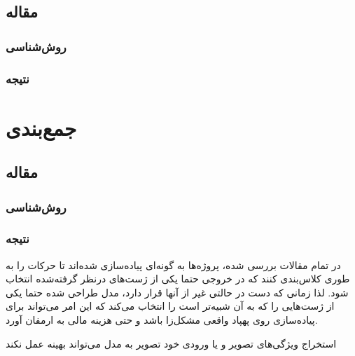 \subsection{مقاله }

\subsubsection{روش‌شناسی}

\subsubsection{نتیجه}

\section{جمع‌بندی}
\cite{waqar2023modeling}

\subsection{مقاله \lr{}}

\subsubsection{روش‌شناسی}

\subsubsection{نتیجه}
\cite{}


در تمام مقالات بررسی شده، پروژه‌ها به گونه‌ای پیاده‌سازی شده‌اند تا حرکات را به طوری کلاس‌بندی کنند که در خروجی حتما یکی از ژست‌های درنظر گرفته‌شده انتخاب شود. لذا زمانی که دست در حالتی غیر از آنها قرار دارد، مدل طراحی شده حتما یکی از ژست‌هایی را که به آن شبیه‌تر است را انتخاب می‌کند که این امر می‌تواند برای پیاده‌سازی روی پهپاد واقعی مشکل‌زا باشد و حتی هزینه مالی به ارمفان آورد.

استخراج ویژگی‌های تصویر و یا ورودی خود تصویر به مدل می‌تواند بهینه عمل نکند